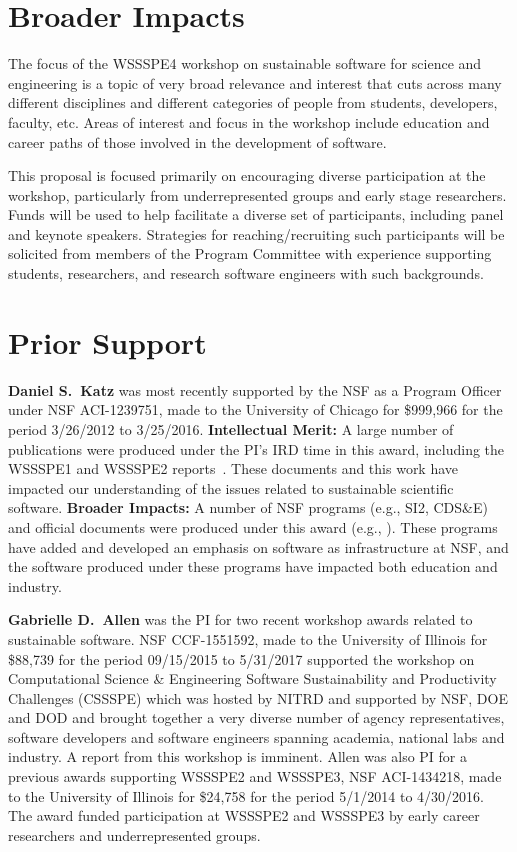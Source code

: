 \documentclass[11pt]{article}
\begin{document}
\section{Broader Impacts} 

The focus of the WSSSPE4 workshop on sustainable software for science and engineering is a topic of very broad relevance and interest that cuts across many different disciplines and different categories of people from students, developers, faculty, etc. Areas of interest and focus in the workshop include education and career paths of those involved in the development of software.

This proposal is focused primarily on encouraging diverse participation at the workshop, particularly from underrepresented groups and early stage researchers. Funds will be used to help facilitate a diverse set of participants, including panel and keynote speakers. 
Strategies for reaching\slash recruiting such participants will be solicited from members of the Program Committee with experience supporting students, researchers, and research software engineers with such backgrounds.

\section{Prior Support} 

\textbf{Daniel S.~Katz}
was most recently supported by the NSF as a Program Officer under NSF ACI-1239751, made to the University of Chicago for \$999,966 for the period 3/26/2012 to 3/25/2016.  {\bf Intellectual Merit:} A large number of publications were produced under the PI's IRD time in this award, including the WSSSPE1 and WSSSPE2 reports~\cite{WSSSPE1, WSSSPE2}. These documents and this work have impacted our understanding of the issues related to sustainable scientific software.  {\bf Broader Impacts:}
A number of NSF programs (e.g., SI2, CDS\&E) and official documents were produced under this award (e.g., \cite{NSF_software_vision}).  These programs have added and developed an emphasis on software as infrastructure at NSF, and the software produced under these programs have impacted both education and industry.

\textbf{Gabrielle D.~Allen}
was the PI for two recent workshop awards related to sustainable software. NSF CCF-1551592, made to the University of Illinois for \$88,739 for the period 09/15/2015 to 5/31/2017 supported the workshop on Computational Science \& Engineering Software Sustainability and Productivity Challenges (CSSSPE) which was hosted by NITRD and supported by NSF, DOE and DOD and brought together a very diverse number of agency representatives, software developers and software engineers spanning academia, national labs and industry. A report from this workshop is imminent. 
Allen was also PI for a previous awards supporting WSSSPE2 and WSSSPE3, NSF ACI-1434218, made to the University of Illinois for \$24,758 for the period 5/1/2014 to 4/30/2016. The award funded participation at WSSSPE2 and WSSSPE3 by early career researchers and underrepresented groups. 
\end{document}
